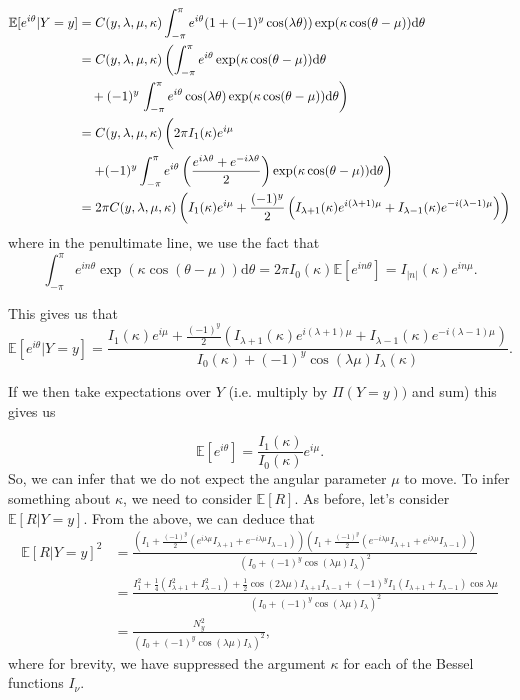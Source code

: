 \documentclass[]{report}
\begin{document}
\begin{align*}
	\mathbb{E}[e^{i \theta} | Y = y] &= C(y, \lambda,\mu, \kappa) \int_{- \pi}^{\pi} e^{i \theta} (1 + (-1)^y \cos(\lambda \theta)) \exp(\kappa \cos(\theta - \mu)) \text{d} \theta \\
& =	C(y, \lambda,\mu, \kappa) \left(  \int_{- \pi}^{\pi} e^{i \theta} \exp(\kappa \cos(\theta - \mu)) \text{d} \theta \right. \\
 & \quad + (-1)^y  \left. \int_{- \pi}^{\pi} e^{i \theta} \cos(\lambda \theta)   \exp(\kappa \cos(\theta - \mu)) \text{d} \theta \right)\\
 &= C(y, \lambda,\mu, \kappa) \left( \vphantom{\int_{-\pi}^\pi} 2 \pi I_1(\kappa) e^{i \mu} \right. \\
 &\quad \left.+ (-1)^y  \int_{-\pi}^{\pi} e^{i \theta} \left( \frac{e^{i \lambda \theta} + e^{- i \lambda \theta}}{2}\right)  \exp(\kappa \cos(\theta - \mu)) \text{d} \theta \right) \\
 &= 2 \pi C(y, \lambda,\mu, \kappa) \left( I_1(\kappa) e^{i \mu} + \frac{(-1)^y}{2} \left(I_{\lambda + 1}(\kappa)e^{i(\lambda + 1) \mu}  + I_{\lambda - 1}(\kappa) e^{-i(\lambda - 1)\mu}\right) \right)
\end{align*}
where in the penultimate line, we use the fact that
\[
\int_{- \pi}^ \pi e^{i n \theta} \exp(\kappa \cos(\theta - \mu)) \text{d} \theta = 2 \pi I_0(\kappa) \mathbb{E}[e^{i n \theta}] = I_{|n|}(\kappa) e^{i n \mu}.
\]

This gives us that
\[
\mathbb{E}[e^{i \theta} | Y = y] = \frac{ I_1(\kappa) e^{i \mu} + \frac{(-1)^y}{2} \left(I_{\lambda + 1}(\kappa)e^{i(\lambda + 1) \mu}  + I_{\lambda - 1}(\kappa) e^{-i(\lambda - 1)\mu}\right)}{I_0(\kappa) + (-1)^y \cos(\lambda \mu) I_\lambda(\kappa)}.
\]

If we then take expectations over $Y$ (i.e. multiply by $\Pi(Y = y))$ and sum) this gives us

\[
\mathbb{E}[e^{i \theta}] = \frac{I_{1}(\kappa)}{I_0(\kappa)}e^{i \mu}.
\]
So, we can infer that we do not expect the angular parameter $\mu$ to move. To infer something about $\kappa$, we need to consider $\mathbb{E}[R]$. As before, let's consider $\mathbb{E}[R | Y = y]$. From the above, we can deduce that
 \begin{align*}
	 \mathbb{E}[R | Y = y]^{2} &= \frac{\left( I_1 + \frac{(-1)^{y}}{2}\left( e^{i \lambda \mu}I_{\lambda + 1}+ e^{- i \lambda \mu}I_{\lambda -1} \right)  \right) \left( I_1 + \frac{(-1)^{y}}{2}\left( e^{-i \lambda \mu}I_{\lambda + 1} + e^{i \lambda \mu} I_{\lambda -1 } \right)  \right) }{\left( I_0 + (-1)^{y}\cos(\lambda \mu) I_{\lambda} \right)^{2} } \\
				   &= \frac{I_1^{2} + \frac{1}{4}\left( I_{\lambda + 1}^2 + I_{\lambda - 1}^2 \right) +\frac{1}{2} \cos\left( 2 \lambda \mu \right)  I_{\lambda +1}I_{\lambda - 1} + (-1)^{y} I_1\left( I_{\lambda + 1} + I_{\lambda - 1} \right) \cos \lambda \mu}{\left( I_0 + (-1)^{y}\cos (\lambda \mu) I_{\lambda} \right) ^2} \\
				   &= \frac{N_y^2}{\left( I_0 + (-1)^{y}\cos(\lambda \mu) I_{\lambda} \right) ^2},
\end{align*}
where for brevity, we have suppressed the argument $\kappa$ for each of the Bessel functions $I_{\nu}$.
\end{document}
